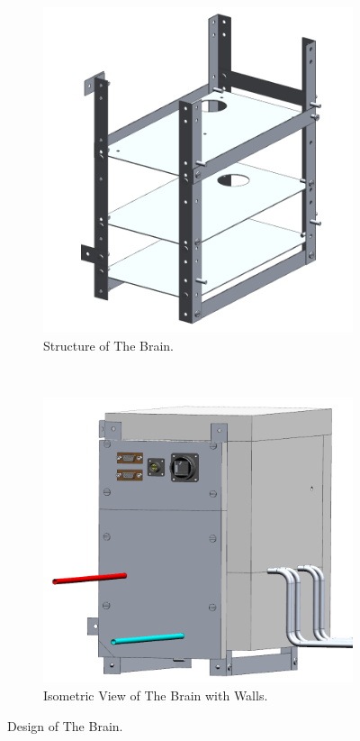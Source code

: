 \begin{figure}[H]
    \centering
    \begin{subfigure}[b]{0.48\textwidth}
    \centering
    \includegraphics[width=\textwidth]{4-experiment-design/img/Mechanical/Brain_Structure.png}
    \caption{Structure of The Brain.}
    \label{brain_structure}
    \end{subfigure}
    ~
    \begin{subfigure}[b]{0.48\textwidth}
    \centering
    \includegraphics[width=\textwidth]{4-experiment-design/img/Mechanical/Brain_Isometric.png}
    \caption{Isometric View of The Brain with Walls.}
    \label{brain_isometric}
    \end{subfigure}
    \caption{Design of The Brain.}
    \label{fig:The-brain}
\end{figure}



